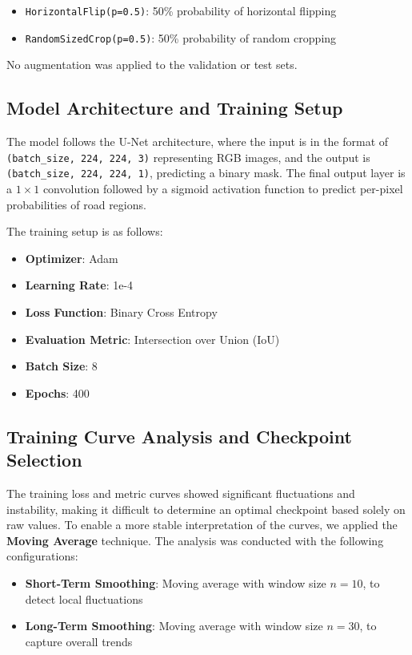 \documentclass{article}
\begin{document}
\begin{itemize}
    \item \texttt{HorizontalFlip(p=0.5)}: 50\% probability of horizontal flipping
    \item \texttt{RandomSizedCrop(p=0.5)}: 50\% probability of random cropping
\end{itemize}

No augmentation was applied to the validation or test sets.


\subsection{Model Architecture and Training Setup}

The model follows the U-Net architecture, where the input is in the format of \texttt{(batch\_size, 224, 224, 3)} representing RGB images, and the output is \texttt{(batch\_size, 224, 224, 1)}, predicting a binary mask. The final output layer is a $1 \times 1$ convolution followed by a sigmoid activation function to predict per-pixel probabilities of road regions.

The training setup is as follows:

\begin{itemize}
    \item \textbf{Optimizer}: Adam
    \item \textbf{Learning Rate}: 1e-4
    \item \textbf{Loss Function}: Binary Cross Entropy
    \item \textbf{Evaluation Metric}: Intersection over Union (IoU)
    \item \textbf{Batch Size}: 8
    \item \textbf{Epochs}: 400
\end{itemize}

\subsection{Training Curve Analysis and Checkpoint Selection}

The training loss and metric curves showed significant fluctuations and instability, making it difficult to determine an optimal checkpoint based solely on raw values. To enable a more stable interpretation of the curves, we applied the \textbf{Moving Average} technique. The analysis was conducted with the following configurations:

\begin{itemize}
    \item \textbf{Short-Term Smoothing}: Moving average with window size $n = 10$, to detect local fluctuations
    \item \textbf{Long-Term Smoothing}: Moving average with window size $n = 30$, to capture overall trends
\end{itemize}
\end{document}

